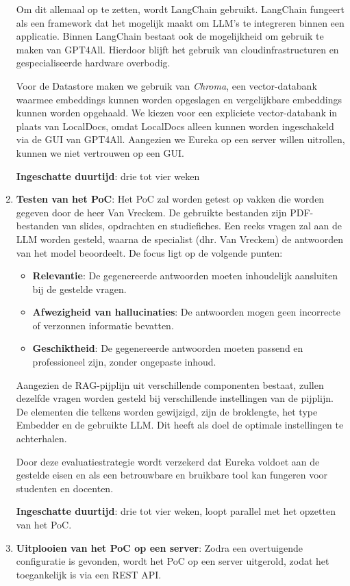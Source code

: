 \begin{enumerate}
     Om dit allemaal op te zetten, wordt LangChain gebruikt. LangChain fungeert als een framework dat het mogelijk maakt om LLM’s te integreren binnen een applicatie. Binnen LangChain bestaat ook de mogelijkheid om gebruik te maken van GPT4All. Hierdoor blijft het gebruik van cloudinfrastructuren en gespecialiseerde hardware overbodig.
     
     Voor de Datastore maken we gebruik van \textit{Chroma}, een vector-databank waarmee embeddings kunnen worden opgeslagen en vergelijkbare embeddings kunnen worden opgehaald. We kiezen voor een expliciete vector-databank in plaats van LocalDocs, omdat LocalDocs alleen kunnen worden ingeschakeld via de GUI van GPT4All. Aangezien we Eureka op een server willen uitrollen, kunnen we niet vertrouwen op een GUI.
     
     \textbf{Ingeschatte duurtijd}: drie tot vier weken
     
     \item \textbf{Testen van het PoC}: Het PoC zal worden getest op vakken die worden gegeven door de heer Van Vreckem. De gebruikte bestanden zijn PDF-bestanden van slides, opdrachten en studiefiches. Een reeks vragen zal aan de LLM worden gesteld, waarna de specialist (dhr. Van Vreckem) de antwoorden van het model beoordeelt. De focus ligt op de volgende punten:
     
     \begin{itemize} 
         \item \textbf{Relevantie}: De gegenereerde antwoorden moeten inhoudelijk aansluiten bij de gestelde vragen. 
         \item \textbf{Afwezigheid van hallucinaties}: De antwoorden mogen geen incorrecte of verzonnen informatie bevatten. 
         \item \textbf{Geschiktheid}: De gegenereerde antwoorden moeten passend en professioneel zijn, zonder ongepaste inhoud. 
     \end{itemize}
     
     Aangezien de RAG-pijplijn uit verschillende componenten bestaat, zullen dezelfde vragen worden gesteld bij verschillende instellingen van de pijplijn. De elementen die telkens worden gewijzigd, zijn de broklengte, het type Embedder en de gebruikte LLM. Dit heeft als doel de optimale instellingen te achterhalen.
     
     
     Door deze evaluatiestrategie wordt verzekerd dat Eureka voldoet aan de gestelde eisen en als een betrouwbare en bruikbare tool kan fungeren voor studenten en docenten.
     
     \textbf{Ingeschatte duurtijd}: drie tot vier weken, loopt parallel met het opzetten van het PoC.
     
     \item \textbf{Uitplooien van het PoC op een server}: Zodra een overtuigende configuratie is gevonden, wordt het PoC op een server uitgerold, zodat het toegankelijk is via een REST API.
\end{enumerate}


